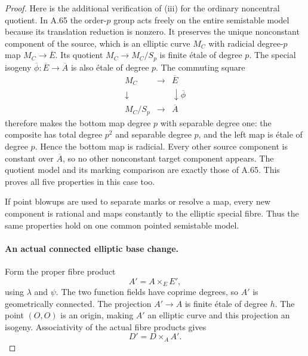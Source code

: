 \begin{proof}
Here is the additional verification of (iii) for the
ordinary noncentral quotient. In A.65 the order-\(p\)
group acts freely on the entire semistable model because
its translation reduction is nonzero. It preserves the
unique nonconstant component of the source, which is an
elliptic curve \(M_C\) with radicial degree-\(p\) map
\(M_C\to\overline E\). Its quotient
\(M_C\to M_C/S_p\) is finite étale of degree \(p\).
The special isogeny
\(\overline\phi:\overline E\to\overline A\) is also
étale of degree \(p\). The commuting square
\[
 \begin{array}{ccc}
 M_C&\longrightarrow&\overline E\\
 \downarrow&&\downarrow\overline\phi\\
 M_C/S_p&\longrightarrow&\overline A
 \end{array}
                                                               \tag{A.66.6}
\]
therefore makes the bottom map degree \(p\) with separable
degree one: the composite has total degree \(p^2\) and
separable degree \(p\), and the left map is étale of degree
\(p\). Hence the bottom map is radicial. Every other source
component is constant over \(\overline A\), so no other
nonconstant target component appears. The quotient model
and its marking comparison are exactly those of A.65.
This proves all five properties in this case too.

If point blowups are used to separate marks or resolve a
map, every new component is rational and maps constantly
to the elliptic special fibre. Thus the same properties
hold on one common pointed semistable model.

\paragraph{An actual connected elliptic base change.}
Form the proper fibre product
\[
                         A'=A\times_E E',
                                                               \tag{A.66.7}
\]
using \(\lambda\) and \(\psi\). The two function fields
have coprime degrees, so \(A'\) is geometrically connected.
The projection \(A'\to A\) is finite étale of degree \(h\).
The point \((O,O)\) is an origin, making \(A'\) an elliptic
curve and this projection an isogeny.
Associativity of the actual fibre products gives
\[
                         D'=D\times_A A'.
                                                               \tag{A.66.8}
\]


\end{proof}
